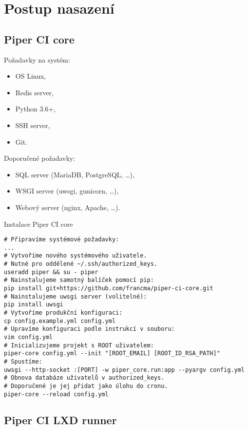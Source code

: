 \clearpage\section{Postup nasazení}

\subsection{Piper CI core}

Požadavky na systém:

\begin{itemize}
	\item OS Linux,
	\item Redis server,
	\item Python 3.6+,
	\item SSH server,
	\item Git.
\end{itemize}

Doporučené požadavky:

\begin{itemize}
	\item SQL server (MariaDB, PostgreSQL, \ldots),
	\item WSGI server (uwsgi, gunicorn, \ldots),
	\item Webový server (nginx, Apache, \ldots).
\end{itemize}

\begin{listing}[H]
\caption{Instalace Piper CI core}
\begin{verbatim}
# Připravíme systémové požadavky:
...
# Vytvoříme nového systémového uživatele.
# Nutné pro oddělené ~/.ssh/authorized_keys.
useradd piper && su - piper
# Nainstalujeme samotný balíček pomocí pip:
pip install git+https://github.com/francma/piper-ci-core.git
# Nainstalujeme uwsgi server (volitelné):
pip install uwsgi
# Vytvoříme produkční konfiguraci:
cp config.example.yml config.yml
# Upravíme konfiguraci podle instrukcí v souboru:
vim config.yml
# Inicializujeme projekt s ROOT uživatelem:
piper-core config.yml --init "[ROOT_EMAIL] [ROOT_ID_RSA_PATH]"
# Spustíme:
uwsgi --http-socket :[PORT] -w piper_core.run:app --pyargv config.yml
# Obnova databáze uživatelů v authorized_keys.
# Doporučené je jej přidat jako úlohu do cronu.
piper-core --reload config.yml
\end{verbatim}
\end{listing}

\subsection{Piper CI LXD runner}

